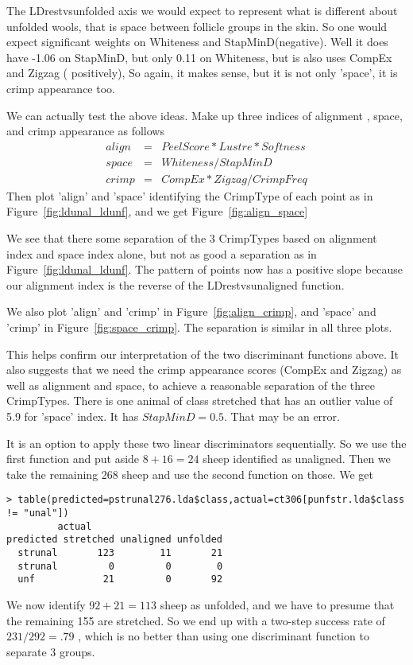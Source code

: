 \documentclass[titlepage]{article}  %
\begin{document}
The LDrestvsunfolded axis we would expect to represent what is different about unfolded wools, that is space between follicle groups in the skin. So one would expect significant weights on Whiteness and StapMinD(negative). Well it does have -1.06 on StapMinD, but only 0.11 on Whiteness, but is also uses CompEx and Zigzag ( positively), So again, it makes sense, but it is not only 'space', it is crimp appearance too. 

We can actually test the above ideas. Make up three indices of alignment , space, and crimp appearance as follows
\begin{eqnarray*}
align & = & PeelScore * Lustre * Softness \\
space & = & Whiteness / StapMinD \\
crimp & = & CompEx * Zigzag / CrimpFreq
\end{eqnarray*}
Then plot 'align' and 'space' identifying the CrimpType of each point as in  Figure~\ref{fig:ldunal_ldunf}, and we get Figure~\ref{fig:align_space}

We see that there some separation of the 3 CrimpTypes based on alignment index and space index alone, but not as good a separation as in Figure~\ref{fig:ldunal_ldunf}. The pattern of points now has a positive slope because our alignment index is the reverse of the LDrestvsunaligned function. 

We also plot 'align' and 'crimp' in Figure~\ref{fig:align_crimp}, and 'space' and 'crimp' in Figure~\ref{fig:space_crimp}. The separation is similar in all three plots.



This helps confirm our interpretation of the two discriminant functions above.  It also suggests that we need the crimp appearance scores (CompEx and Zigzag)  as well as alignment and space, to achieve a reasonable separation of the three CrimpTypes. There is one animal of class stretched that has an outlier value of 5.9 for 'space' index. It has $StapMinD = 0.5$. That may be an error.


It is an option to apply these two linear discriminators sequentially. So we use the first function and put aside $8 + 16 = 24$ sheep identified as unaligned. Then we take the remaining  268 sheep and use the second function on those. We get
\begin{verbatim}
> table(predicted=pstrunal276.lda$class,actual=ct306[punfstr.lda$class != "unal"])
         actual
predicted stretched unaligned unfolded
  strunal       123        11       21
  strunal         0         0        0
  unf            21         0       92
\end{verbatim}
We now identify $92 + 21 = 113$ sheep as unfolded, and we have to presume that the remaining 155 are stretched.
So we end up with a two-step success rate of $231/292=.79$ , which is no better than using one discriminant function to separate 3 groups.
\end{document}
